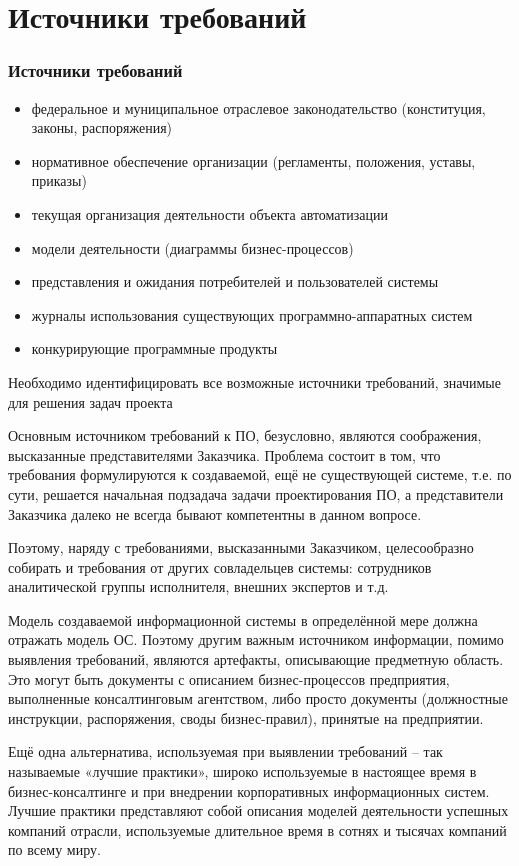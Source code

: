 \documentclass{../industrial-development}
\begin{document}
\section{Источники требований}
\begin{frame} \frametitle{Источники требований}
 \begin{itemize}
\item федеральное и муниципальное отраслевое законодательство (конституция, законы, распоряжения)
\item нормативное обеспечение организации (регламенты, положения, уставы, приказы)
\item текущая организация деятельности объекта автоматизации
\item модели деятельности (диаграммы бизнес-процессов)
\item представления и ожидания потребителей и пользователей системы
\item журналы использования существующих программно-аппаратных систем
\item конкурирующие программные продукты
  \end{itemize}
Необходимо идентифицировать \alert{все возможные источники требований}, значимые для решения задач проекта
\end{frame}

\lecturenotes

Основным источником требований к ПО, безусловно, являются соображения, высказанные представителями Заказчика. Проблема состоит в том, что требования формулируются к создаваемой, ещё не существующей системе, т.е. по сути, решается начальная подзадача задачи проектирования ПО, а представители Заказчика далеко не всегда бывают компетентны в данном вопросе. 

Поэтому, наряду с требованиями, высказанными Заказчиком, целесообразно собирать и требования от других совладельцев системы: сотрудников аналитической группы исполнителя, внешних экспертов и т.д.

Модель создаваемой информационной системы в определённой мере должна отражать модель ОС. Поэтому другим важным источником информации, помимо выявления требований, являются артефакты, описывающие предметную область. Это могут быть документы с описанием бизнес-процессов предприятия, выполненные консалтинговым агентством, либо просто документы (должностные инструкции, распоряжения, своды бизнес-правил), принятые на предприятии.

Ещё одна альтернатива, используемая при выявлении требований – так называемые «лучшие практики», широко используемые в настоящее время в бизнес-консалтинге и при внедрении корпоративных информационных систем. Лучшие практики представляют собой описания моделей деятельности успешных компаний отрасли, используемые длительное время в сотнях и тысячах компаний по всему миру.
\end{document}
